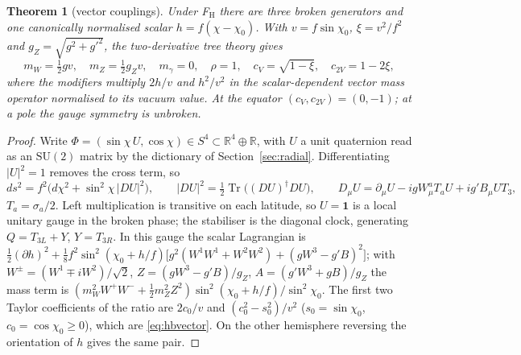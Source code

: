 \documentclass[aps,pra,onecolumn,superscriptaddress,nofootinbib,10pt]{revtex4-2}
\newtheorem{theorem}{Theorem}
\theoremstyle{definition}
\theoremstyle{remark}
\newcommand{\R}{\mathbb{R}}
\newcommand{\tr}{\operatorname{Tr}}
\newcommand{\SU}{\mathrm{SU}}
\begin{document}
\begin{theorem}[vector couplings]\label{thm:hbvector}
Under F$_{\mathrm H}$ there are three broken generators and one canonically normalised scalar $h=f(\chi-\chi_0)$.  With
$v=f\sin\chi_0$, $\xi=v^2/f^2$ and $g_Z=\sqrt{g^2+g'^2}$, the two-derivative tree theory gives
\begin{equation}\label{eq:hbvector}
m_W=\tfrac12gv,\quad m_Z=\tfrac12g_Zv,\quad m_\gamma=0,\quad \rho=1,\quad c_V=\sqrt{1-\xi},\quad c_{2V}=1-2\xi,
\end{equation}
where the modifiers multiply $2h/v$ and $h^2/v^2$ in the scalar-dependent vector mass operator normalised to its
vacuum value.  At the equator $(c_V,c_{2V})=(0,-1)$; at a pole the gauge symmetry is unbroken.
\end{theorem}
\begin{proof}
Write $\Phi=(\sin\chi\,U,\cos\chi)\in S^4\subset\R^4\oplus\R$, with $U$ a unit quaternion read as an $\SU(2)$ matrix by the dictionary
of Section~\ref{sec:radial}.  Differentiating $\lvert U\rvert^2=1$ removes the cross term, so
\begin{equation}\label{eq:hbmetric}
ds^2=f^2\bigl(d\chi^2+\sin^2\chi\,\lvert DU\rvert^2\bigr),\qquad \lvert DU\rvert^2=\tfrac12\tr\bigl((DU)^\dagger DU\bigr),\qquad
D_\mu U=\partial_\mu U-igW^a_\mu T_aU+ig'B_\mu UT_3,
\end{equation}
$T_a=\sigma_a/2$.  Left multiplication is transitive on each latitude, so $U=\mathbf1$ is a local unitary gauge in the
broken phase; the stabiliser is the diagonal clock, generating $Q=T_{3L}+Y$, $Y=T_{3R}$.  In this gauge the
scalar Lagrangian is $\tfrac12(\partial h)^2+\tfrac18f^2\sin^2(\chi_0+h/f)\bigl[g^2(W^1W^1+W^2W^2)+(gW^3-g'B)^2\bigr]$; with $W^\pm=(W^1\mp iW^2)/\sqrt2$,
$Z=(gW^3-g'B)/g_Z$, $A=(g'W^3+gB)/g_Z$ the mass term is $(m_W^2W^+W^-+\tfrac12m_Z^2Z^2)\sin^2(\chi_0+h/f)/\sin^2\chi_0$.  The first two
Taylor coefficients of the ratio are $2c_0/v$ and $(c_0^2-s_0^2)/v^2$ ($s_0=\sin\chi_0$, $c_0=\cos\chi_0\ge0$), which are \eqref{eq:hbvector}.
On the other hemisphere reversing the orientation of $h$ gives the same pair.
\end{proof}
\end{document}

